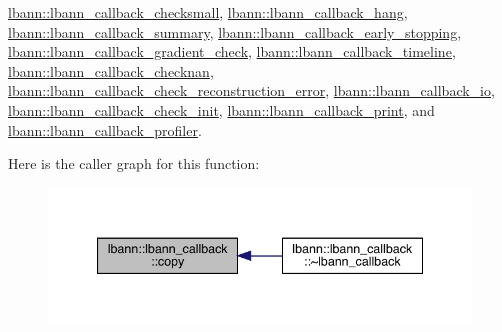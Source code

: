 \hyperlink{classlbann_1_1lbann__callback__checksmall_ae0601cd90b165049063783d4d501ffde}{lbann\+::lbann\+\_\+callback\+\_\+checksmall}, \hyperlink{classlbann_1_1lbann__callback__hang_a047660bd517f5c669c8e2abc4f2e951f}{lbann\+::lbann\+\_\+callback\+\_\+hang}, \hyperlink{classlbann_1_1lbann__callback__summary_ae6f1ba60d92f4599361ce5bd5f70caa7}{lbann\+::lbann\+\_\+callback\+\_\+summary}, \hyperlink{classlbann_1_1lbann__callback__early__stopping_aa8e7bd4e9dde8e57dbc416dc75e25cc6}{lbann\+::lbann\+\_\+callback\+\_\+early\+\_\+stopping}, \hyperlink{classlbann_1_1lbann__callback__gradient__check_a3cf248258a45ee721907864d62a17355}{lbann\+::lbann\+\_\+callback\+\_\+gradient\+\_\+check}, \hyperlink{classlbann_1_1lbann__callback__timeline_aa1359380162f29838be3cdb0bb25b3e3}{lbann\+::lbann\+\_\+callback\+\_\+timeline}, \hyperlink{classlbann_1_1lbann__callback__checknan_ad7156df3cd81c493584ebd4a0c9d96b4}{lbann\+::lbann\+\_\+callback\+\_\+checknan}, \hyperlink{classlbann_1_1lbann__callback__check__reconstruction__error_a7c2367fdebae1798c6cbf2846c7492a3}{lbann\+::lbann\+\_\+callback\+\_\+check\+\_\+reconstruction\+\_\+error}, \hyperlink{classlbann_1_1lbann__callback__io_aec8c75427c424999d01a18a9fb8e0b0d}{lbann\+::lbann\+\_\+callback\+\_\+io}, \hyperlink{classlbann_1_1lbann__callback__check__init_aa210192427df3f6aa7e12509e9b57f56}{lbann\+::lbann\+\_\+callback\+\_\+check\+\_\+init}, \hyperlink{classlbann_1_1lbann__callback__print_aa75e076c3d840a2186825be2e8dbac8c}{lbann\+::lbann\+\_\+callback\+\_\+print}, and \hyperlink{classlbann_1_1lbann__callback__profiler_a53351de95859a8a9f3a689ed72970663}{lbann\+::lbann\+\_\+callback\+\_\+profiler}.

Here is the caller graph for this function\+:\nopagebreak
\begin{figure}[H]
\begin{center}
\leavevmode
\includegraphics[width=340pt]{classlbann_1_1lbann__callback_a9f545d1269a8c7af335625d049691f26_icgraph}
\end{center}
\end{figure}
\mbox{\label{classlbann_1_1lbann__callback_acec888932129f93ba2a0077192467c9e}} 
